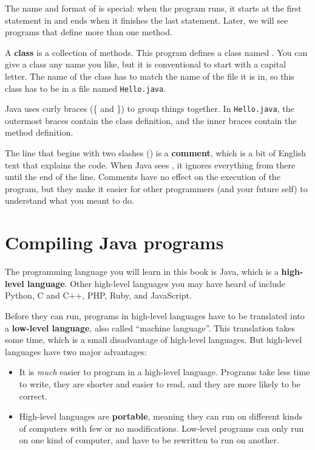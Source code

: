 
The name and format of  is special: when the program runs, it starts at the first statement in  and ends when it finishes the last statement.
Later, we will see programs that define more than one method.


A {\bf class} is a collection of methods.
This program defines a class named .
You can give a class any name you like, but it is conventional to start with a capital letter.
The name of the class has to match the name of the file it is in, so this class has to be in a file named {\tt Hello.java}.


Java uses curly braces (\{ and \}) to group things together.
In {\tt Hello.java}, the outermost braces contain the class definition, and the inner braces contain the method definition.


The line that begins with two slashes (\java{//}) is a {\bf comment}, which is a bit of English text that explains the code.
When Java sees \java{//}, it ignores everything from there until the end of the line.
Comments have no effect on the execution of the program, but they make it easier for other programmers (and your future self) to understand what you meant to do.


\section{Compiling Java programs}


The programming language you will learn in this book is Java, which is a {\bf high-level language}.
Other high-level languages you may have heard of include Python, C and C++, PHP, Ruby, and JavaScript.


Before they can run, programs in high-level languages have to be translated into a {\bf low-level language}, also called ``machine language''.
This translation takes some time, which is a small disadvantage of high-level languages.
But high-level languages have two major advantages:

\begin{itemize}

\item It is {\em much} easier to program in a high-level language.
Programs take less time to write, they are shorter and easier to read, and they are more likely to be correct.


\item High-level languages are {\bf portable}, meaning they can run on different kinds of computers with few or no modifications.
Low-level programs can only run on one kind of computer, and have to be rewritten to run on another.

\end{itemize}

